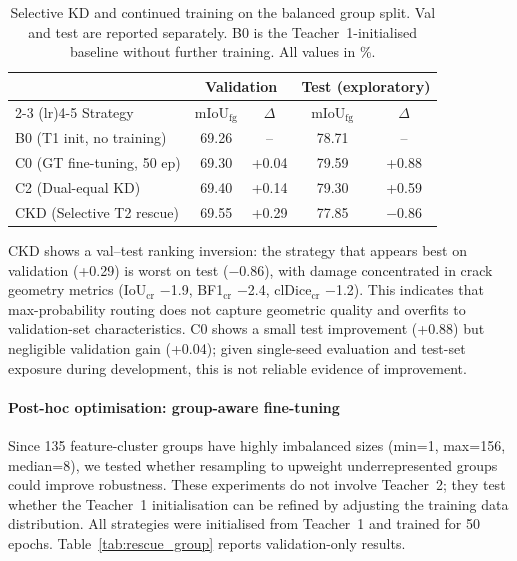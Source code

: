 \documentclass[review,authoryear]{elsarticle}
\begin{document}
\begin{table}[t]
\centering
\caption{Selective KD and continued training on the balanced group split. Val and test are reported separately. B0 is the Teacher~1-initialised baseline without further training. All values in \%.}
\label{tab:rescue_kd}
\setlength{\tabcolsep}{4pt}
\begin{tabular}{lcccc}
\toprule
 & \multicolumn{2}{c}{Validation} & \multicolumn{2}{c}{Test (exploratory)} \\
\cmidrule(lr){2-3} \cmidrule(lr){4-5}
Strategy & mIoU$_{\text{fg}}$ & $\Delta$ & mIoU$_{\text{fg}}$ & $\Delta$ \\
\midrule
B0 (T1 init, no training) & 69.26 & -- & 78.71 & -- \\
C0 (GT fine-tuning, 50 ep) & 69.30 & +0.04 & 79.59 & +0.88 \\
C2 (Dual-equal KD) & 69.40 & +0.14 & 79.30 & +0.59 \\
CKD (Selective T2 rescue) & 69.55 & +0.29 & 77.85 & $-$0.86 \\
\bottomrule
\end{tabular}
\end{table}

CKD shows a val--test ranking inversion: the strategy that appears best on validation (+0.29) is worst on test ($-$0.86), with damage concentrated in crack geometry metrics (IoU$_{\text{cr}}$ $-$1.9, BF1$_{\text{cr}}$ $-$2.4, clDice$_{\text{cr}}$ $-$1.2).
This indicates that max-probability routing does not capture geometric quality and overfits to validation-set characteristics.
C0 shows a small test improvement (+0.88) but negligible validation gain (+0.04); given single-seed evaluation and test-set exposure during development, this is not reliable evidence of improvement.

\paragraph{Post-hoc optimisation: group-aware fine-tuning}
Since 135 feature-cluster groups have highly imbalanced sizes (min=1, max=156, median=8), we tested whether resampling to upweight underrepresented groups could improve robustness.
These experiments do not involve Teacher~2; they test whether the Teacher~1 initialisation can be refined by adjusting the training data distribution.
All strategies were initialised from Teacher~1 and trained for 50 epochs.
Table~\ref{tab:rescue_group} reports validation-only results.
\end{document}
